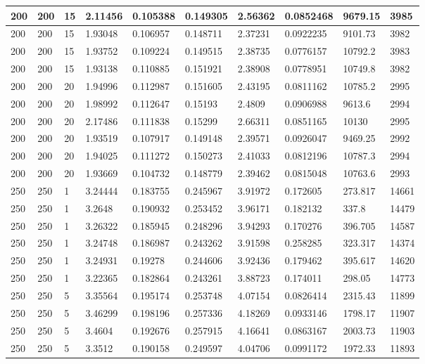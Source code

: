\begin{landscape}
\begin{longtable}{ | l | l | l | l | l | l | l | l | l | l | }
200 & 200 & 15 & 2.11456 & 0.105388 & 0.149305 & 2.56362 & 0.0852468 & 9679.15 & 3985\\ \hline
200 & 200 & 15 & 1.93048 & 0.106957 & 0.148711 & 2.37231 & 0.0922235 & 9101.73 & 3982\\ \hline
200 & 200 & 15 & 1.93752 & 0.109224 & 0.149515 & 2.38735 & 0.0776157 & 10792.2 & 3983\\ \hline
200 & 200 & 15 & 1.93138 & 0.110885 & 0.151921 & 2.38908 & 0.0778951 & 10749.8 & 3982\\ \hline
200 & 200 & 20 & 1.94996 & 0.112987 & 0.151605 & 2.43195 & 0.0811162 & 10785.2 & 2995\\ \hline
200 & 200 & 20 & 1.98992 & 0.112647 & 0.15193 & 2.4809 & 0.0906988 & 9613.6 & 2994\\ \hline
200 & 200 & 20 & 2.17486 & 0.111838 & 0.15299 & 2.66311 & 0.0851165 & 10130 & 2995\\ \hline
200 & 200 & 20 & 1.93519 & 0.107917 & 0.149148 & 2.39571 & 0.0926047 & 9469.25 & 2992\\ \hline
200 & 200 & 20 & 1.94025 & 0.111272 & 0.150273 & 2.41033 & 0.0812196 & 10787.3 & 2994\\ \hline
200 & 200 & 20 & 1.93669 & 0.104732 & 0.148779 & 2.39462 & 0.0815048 & 10763.6 & 2993\\ \hline
250 & 250 & 1 & 3.24444 & 0.183755 & 0.245967 & 3.91972 & 0.172605 & 273.817 & 14661\\ \hline
250 & 250 & 1 & 3.2648 & 0.190932 & 0.253452 & 3.96171 & 0.182132 & 337.8 & 14479\\ \hline
250 & 250 & 1 & 3.26322 & 0.185945 & 0.248296 & 3.94293 & 0.170276 & 396.705 & 14587\\ \hline
250 & 250 & 1 & 3.24748 & 0.186987 & 0.243262 & 3.91598 & 0.258285 & 323.317 & 14374\\ \hline
250 & 250 & 1 & 3.24931 & 0.19278 & 0.244606 & 3.92436 & 0.179462 & 395.617 & 14620\\ \hline
250 & 250 & 1 & 3.22365 & 0.182864 & 0.243261 & 3.88723 & 0.174011 & 298.05 & 14773\\ \hline
250 & 250 & 5 & 3.35564 & 0.195174 & 0.253748 & 4.07154 & 0.0826414 & 2315.43 & 11899\\ \hline
250 & 250 & 5 & 3.46299 & 0.198196 & 0.257336 & 4.18269 & 0.0933146 & 1798.17 & 11907\\ \hline
250 & 250 & 5 & 3.4604 & 0.192676 & 0.257915 & 4.16641 & 0.0863167 & 2003.73 & 11903\\ \hline
250 & 250 & 5 & 3.3512 & 0.190158 & 0.249597 & 4.04706 & 0.0991172 & 1972.33 & 11893\\ \hline

\end{longtable}
\end{landscape}
